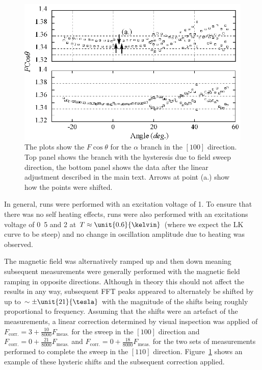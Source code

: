 \begin{figure}[htbp]
    \begin{center}
        \includegraphics[scale=0.9]{Chapter-dHvABaFe2P2/Figures/AngleDepMeasurements/HysteresisCorrection/HysteresisCorrection}
        \caption{The plots show the $F\cos \theta$ for the $\alpha$ branch in the $[100]$ direction. Top panel shows the branch with the hysteresis due to field sweep direction, the bottom panel shows the data after the linear adjustment described in the main text. Arrows at point (a.) show how the points were shifted.}
        \label{Fig:ResD:HysteresisCorrection}
    \end{center}
\end{figure}

In general, runs were performed with an excitation voltage of \unit{1}{\volt}. To ensure that there was no self heating effects, runs were also performed with an excitations voltage of \unit{0.5}{\volt} and \unit{2}{\volt} at $T\approx\unit{0.6}{\kelvin}$ (where we expect the \ac{LK} curve to be steep) and no change in oscillation amplitude due to heating was observed.

The magnetic field was alternatively ramped up and then down meaning subsequent measurements were generally performed with the magnetic field ramping in opposite directions. Although in theory this should not affect the results in any way, subsequent \ac{FFT} peaks appeared to alternately be shifted by up to $\sim\pm\unit{21}{\tesla}$ with the magnitude of the shifts being roughly proportional to frequency. Assuming that the shifts were an artefact of the measurements, a linear correction determined by visual inspection was applied of $F_{\textrm{corr.}} = 3 + \frac{10}{8000} F_{\textrm{meas.}}$ for the sweep in the $[100]$ direction and $F_{\textrm{corr.}} = 0 + \frac{21}{8000}  F_{\textrm{meas.}}$ and  $F_{\textrm{corr.}} = 0 + \frac{18}{8000} F_{\textrm{meas.}}$ for the two sets of measurements performed to complete the sweep in the $[110]$ direction. Figure~\ref{Fig:ResD:HysteresisCorrection} shows an example of these hysteric shifts and the subsequent correction applied.

